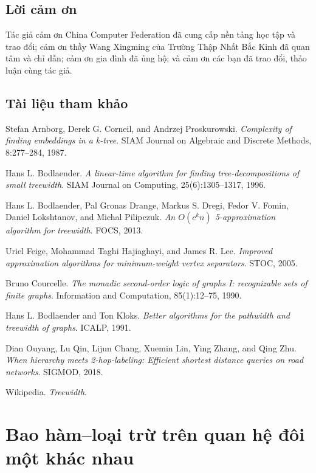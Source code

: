 \documentclass[11pt]{article}
\begin{document}
\subsection{Lời cảm ơn}

Tác giả cảm ơn China Computer Federation đã cung cấp nền tảng học tập và trao
đổi; cảm ơn thầy Wang Xingming của Trường Thập Nhất Bắc Kinh đã quan tâm và chỉ
dẫn; cảm ơn gia đình đã ủng hộ; và cảm ơn các bạn đã trao đổi, thảo luận cùng
tác giả.

\subsection{Tài liệu tham khảo}

\begin{enumerate}[label={[\arabic*]}]
  \item Stefan Arnborg, Derek G. Corneil, and Andrzej Proskurowski.
  \emph{Complexity of finding embeddings in a k-tree}. SIAM Journal on
  Algebraic and Discrete Methods, 8:277--284, 1987.
  \item Hans L. Bodlaender. \emph{A linear-time algorithm for finding
  tree-decompositions of small treewidth}. SIAM Journal on Computing,
  25(6):1305--1317, 1996.
  \item Hans L. Bodlaender, Pal Gronas Drange, Markus S. Dregi, Fedor V. Fomin,
  Daniel Lokshtanov, and Michal Pilipczuk. \emph{An $O(c^k n)$ 5-approximation
  algorithm for treewidth}. FOCS, 2013.
  \item Uriel Feige, Mohammad Taghi Hajiaghayi, and James R. Lee.
  \emph{Improved approximation algorithms for minimum-weight vertex
  separators}. STOC, 2005.
  \item Bruno Courcelle. \emph{The monadic second-order logic of graphs I:
  recognizable sets of finite graphs}. Information and Computation,
  85(1):12--75, 1990.
  \item Hans L. Bodlaender and Ton Kloks. \emph{Better algorithms for the
  pathwidth and treewidth of graphs}. ICALP, 1991.
  \item Dian Ouyang, Lu Qin, Lijun Chang, Xuemin Lin, Ying Zhang, and Qing Zhu.
  \emph{When hierarchy meets 2-hop-labeling: Efficient shortest distance
  queries on road networks}. SIGMOD, 2018.
  \item Wikipedia. \emph{Treewidth}.
\end{enumerate}

\section{Bao hàm--loại trừ trên quan hệ đôi một khác nhau}
\end{document}
